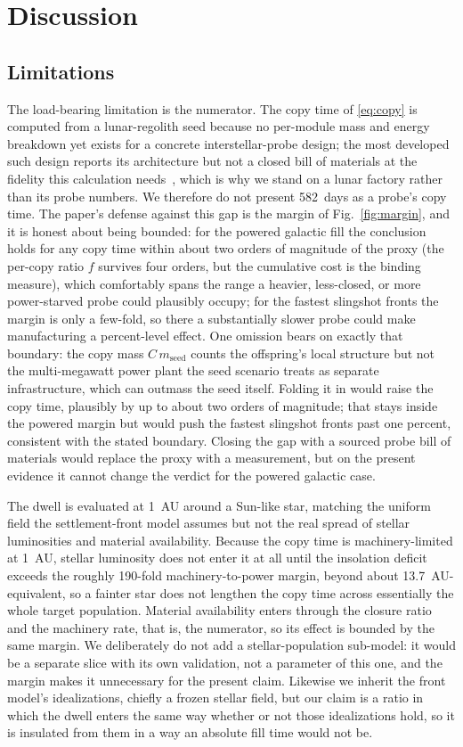 \section{Discussion}
\label{sec:discussion}

\subsection{Limitations}
The load-bearing limitation is the numerator. The copy time of \eqref{eq:copy} is computed
from a lunar-regolith seed because no per-module mass and energy breakdown yet exists for a
concrete interstellar-probe design; the most developed such design reports its architecture
but not a closed bill of materials at the fidelity this calculation
needs~\citep{borgue-hein-2020}, which is why we stand on a lunar factory rather than its probe
numbers. We therefore do not present 582~days as a probe's copy time. The paper's defense
against this gap is the margin of Fig.~\ref{fig:margin}, and it is honest about being bounded:
for the powered galactic fill the conclusion holds for any copy time within about two orders of
magnitude of the proxy (the per-copy ratio $f$ survives four orders, but the cumulative cost is
the binding measure), which comfortably spans the range a heavier, less-closed, or more
power-starved probe could plausibly occupy; for the fastest slingshot fronts the margin is only
a few-fold, so there a substantially slower probe could make manufacturing a percent-level
effect. One omission bears on exactly that boundary: the copy mass $C\,m_\mathrm{seed}$ counts
the offspring's local structure but not the multi-megawatt power plant the seed scenario treats
as separate infrastructure, which can outmass the seed itself. Folding it in would raise the
copy time, plausibly by up to about two orders of magnitude; that stays inside the powered
margin but would push the fastest slingshot fronts past one percent, consistent with the stated
boundary. Closing the gap with a sourced probe bill of materials would replace the proxy with a
measurement, but on the present evidence it cannot change the verdict for the powered galactic
case.

The dwell is evaluated at 1~AU around a Sun-like star, matching the uniform field the
settlement-front model assumes but not the real spread of stellar luminosities and material
availability. Because the copy time is machinery-limited at 1~AU, stellar luminosity does not
enter it at all until the insolation deficit exceeds the roughly 190-fold machinery-to-power
margin, beyond about 13.7~AU-equivalent, so a fainter star does not lengthen the copy time
across essentially the whole target population. Material availability enters through the closure
ratio and the machinery rate, that is, the numerator, so its effect is bounded by the same
margin. We deliberately do not add a stellar-population sub-model: it would be a separate slice
with its own validation, not a parameter of this one, and the margin makes it unnecessary for
the present claim. Likewise we
inherit the front model's idealizations, chiefly a frozen stellar field, but our claim is a
ratio in which the dwell enters the same way whether or not those idealizations hold, so it is
insulated from them in a way an absolute fill time would not be.

